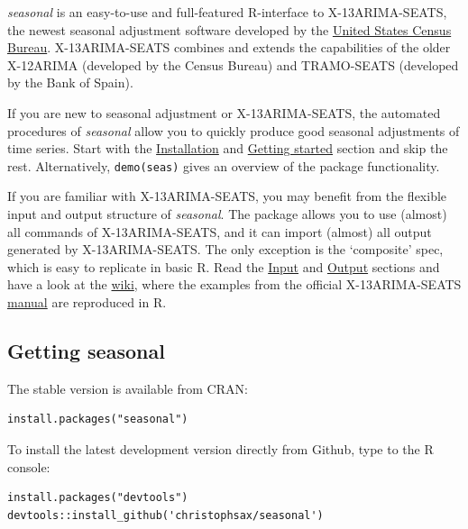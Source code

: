 \emph{seasonal} is an easy-to-use and full-featured R-interface to
X-13ARIMA-SEATS, the newest seasonal adjustment software developed by
the \href{http://www.census.gov/srd/www/x13as/}{United States Census
Bureau}. X-13ARIMA-SEATS combines and extends the capabilities of the
older X-12ARIMA (developed by the Census Bureau) and TRAMO-SEATS
(developed by the Bank of Spain).

If you are new to seasonal adjustment or X-13ARIMA-SEATS, the automated
procedures of \emph{seasonal} allow you to quickly produce good seasonal
adjustments of time series. Start with the
\hyperref[installation]{Installation} and
\hyperref[getting-started]{Getting started} section and skip the rest.
Alternatively, \texttt{demo(seas)} gives an overview of the package
functionality.

If you are familiar with X-13ARIMA-SEATS, you may benefit from the
flexible input and output structure of \emph{seasonal}. The package
allows you to use (almost) all commands of X-13ARIMA-SEATS, and it can
import (almost) all output generated by X-13ARIMA-SEATS. The only
exception is the `composite' spec, which is easy to replicate in basic
R. Read the \hyperref[input]{Input} and \hyperref[output]{Output}
sections and have a look at the
\href{https://github.com/christophsax/seasonal/wiki/Examples-of-X-13ARIMA-SEATS-in-R}{wiki},
where the examples from the official X-13ARIMA-SEATS
\href{http://www.census.gov/ts/x13as/docX13ASHTML.pdf}{manual} are
reproduced in R.


\subsection{Getting seasonal}\label{getting-seasonal}

The stable version is available from CRAN:

\begin{verbatim}
install.packages("seasonal")
\end{verbatim}

To install the latest development version directly from Github, type to
the R console:

\begin{verbatim}
install.packages("devtools")       
devtools::install_github('christophsax/seasonal')      
\end{verbatim}

